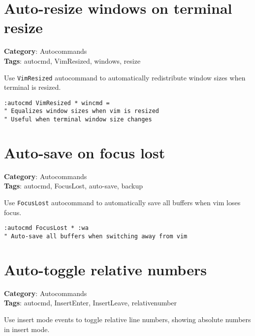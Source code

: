 \section{Auto-resize windows on terminal resize}

\textbf{Category}: Autocommands\\ \textbf{Tags}: autocmd, VimResized, windows, resize
\vspace{0.5cm}

Use {\footnotesize \Verb§VimResized§} autocommand to automatically redistribute window sizes when terminal is resized.

\begin{Exa*}{}
\begin{Verbatim}[fontsize=\footnotesize, breaklines, breakanywhere]
:autocmd VimResized * wincmd =
" Equalizes window sizes when vim is resized
" Useful when terminal window size changes
\end{Verbatim}
\end{Exa*}

\section{Auto-save on focus lost}

\textbf{Category}: Autocommands\\ \textbf{Tags}: autocmd, FocusLost, auto-save, backup
\vspace{0.5cm}

Use {\footnotesize \Verb§FocusLost§} autocommand to automatically save all buffers when vim loses focus.

\begin{Exa*}{}
\begin{Verbatim}[fontsize=\footnotesize, breaklines, breakanywhere]
:autocmd FocusLost * :wa
" Auto-save all buffers when switching away from vim
\end{Verbatim}
\end{Exa*}

\section{Auto-toggle relative numbers}

\textbf{Category}: Autocommands\\ \textbf{Tags}: autocmd, InsertEnter, InsertLeave, relativenumber
\vspace{0.5cm}

Use insert mode events to toggle relative line numbers, showing absolute numbers in insert mode.

